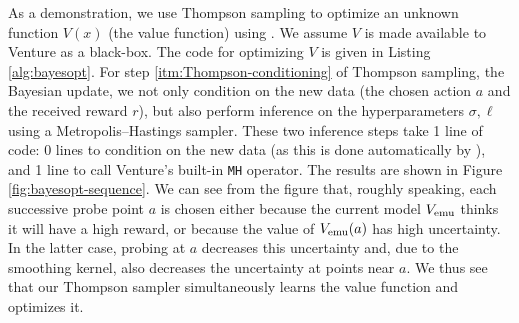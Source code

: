 
As a demonstration, we use Thompson sampling to optimize an unknown function $V(x)$ (the value function) using \gpmem.
We assume $V$ is made available to Venture as a black-box.
The code for optimizing $V$ is given in Listing \ref{alg:bayesopt}.
For step \ref{itm:Thompson-conditioning} of Thompson sampling, the Bayesian update, we not only condition on the new data (the chosen action $a$ and the received reward $r$), but also perform inference on the hyperparameters $\sigma, \ell$ using a Metropolis--Hastings sampler.
These two inference steps take 1 line of code: 0 lines to condition on the new data (as this is done automatically by \gpmem), and 1 line to call Venture's built-in \texttt{MH} operator.
The results are shown in Figure \ref{fig:bayesopt-sequence}.
We can see from the figure that, roughly speaking, each successive probe point $a$ is chosen either because the current model $V_{\textrm{emu}}$ thinks it will have a high reward, or because the value of $V_{\textrm{emu}}(a)$ has high uncertainty.
In the latter case, probing at $a$ decreases this uncertainty and, due to the smoothing kernel, also decreases the uncertainty at points near $a$.
We thus see that our Thompson sampler simultaneously learns the value function and optimizes it.

